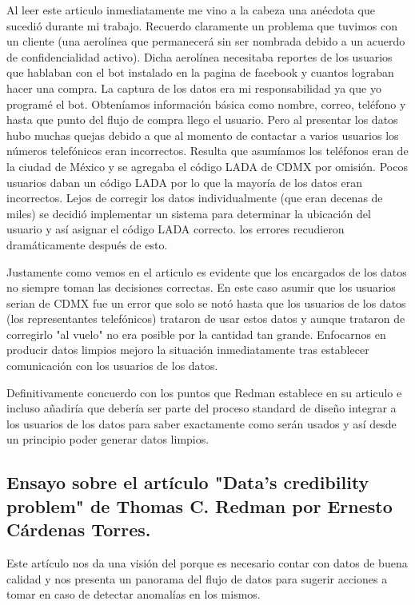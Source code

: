 \documentclass{exam}
\begin{document}
Al leer este articulo inmediatamente me vino a la cabeza una anécdota que sucedió durante mi trabajo. Recuerdo claramente un problema que tuvimos con un cliente (una aerolínea que permanecerá sin ser nombrada debido a un acuerdo de confidencialidad activo). Dicha aerolínea necesitaba reportes de los usuarios que hablaban con el bot instalado en la pagina de facebook y cuantos lograban hacer una compra. La captura de los datos era mi responsabilidad ya que yo programé el bot. Obteníamos información básica como nombre, correo, teléfono y hasta que punto del flujo de compra llego el usuario. Pero al presentar los datos hubo muchas quejas debido a que al momento de contactar a varios usuarios los números telefónicos eran incorrectos. Resulta que asumíamos los teléfonos eran de la ciudad de México y se agregaba el código LADA de CDMX por omisión. Pocos usuarios daban un código LADA por lo que la mayoría de los datos eran incorrectos. Lejos de corregir los datos individualmente (que eran decenas de miles) se decidió implementar un sistema para determinar la ubicación del usuario y así asignar el código LADA correcto. los errores recudieron dramáticamente después de esto.

Justamente como vemos en el articulo es evidente que los encargados de los datos no siempre toman las decisiones correctas. En este caso asumir que los usuarios serian de CDMX fue un error que solo se notó hasta que los usuarios de los datos (los representantes telefónicos) trataron de usar estos datos y aunque trataron de corregirlo "al vuelo" no era posible por la cantidad tan grande. Enfocarnos en producir datos limpios mejoro la situación inmediatamente tras establecer comunicación con los usuarios de los datos.

Definitivamente concuerdo con los puntos que Redman establece en su articulo e incluso añadiría que debería ser parte del proceso standard de diseño integrar a los usuarios de los datos para saber exactamente como serán usados y así desde un principio poder generar datos limpios.

\pagebreak

\subsection*{Ensayo sobre el artículo "Data's credibility problem" de Thomas C. Redman por Ernesto Cárdenas Torres.}

Este artículo nos da una visión del porque es necesario contar con datos de buena calidad y nos presenta un panorama del flujo de datos para sugerir acciones a tomar en caso de detectar anomalías en los mismos.
\end{document}
